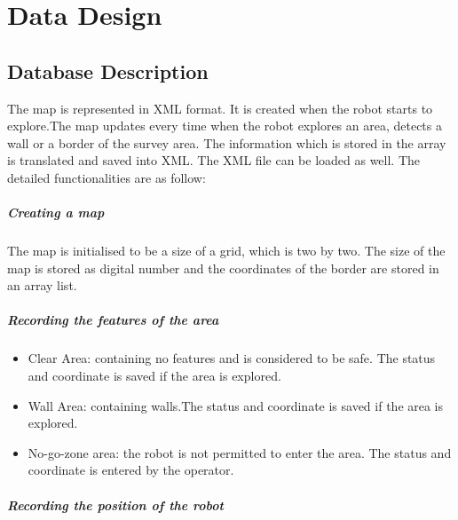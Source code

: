\documentclass[11pt, a4paper]{report}
\begin{document}
\pagebreak


\chapter{Data Design}%
\label{cha:DD1}

\section{Database Description}
The map is represented in XML format. It is created when the robot starts to explore.The map updates every time when the robot explores an area, detects
a wall or a border of the survey area. The information which is stored in the array is translated
and saved into XML. The XML file can be loaded as well. The detailed functionalities are
as follow:

\paragraph{Creating a map}

The map is initialised to be a size of a grid, which is two by two.
The size of the map is stored as digital number and the coordinates of the border are stored in an
array list.

\paragraph{Recording the features of the area}

\begin{itemize}
  \item  Clear Area: containing no features and is considered to be safe. The status and coordinate
   is saved if the area is explored.
\item	Wall Area: containing walls.The status and coordinate is saved if the area is explored.
\item  No-go-zone area: the robot is not permitted to enter the area. The status and coordinate is
entered by the operator.
\end{itemize}

\paragraph{Recording the position of the robot}
\end{document}
